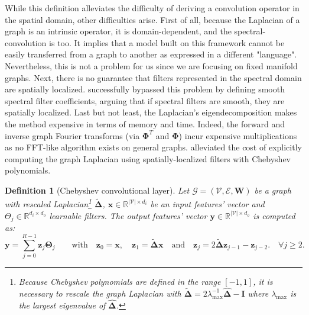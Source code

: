 \documentclass{article}
\newtheorem{definition}{Definition}[section]
\begin{document}
While this definition alleviates the difficulty of deriving a convolution operator in the spatial domain, other difficulties arise. First of all, because the Laplacian of a graph is an intrinsic operator, it is domain-dependent, and the spectral-convolution is too. It implies that a model built on this framework cannot be easily transferred from a graph to another as expressed in a different "language". Nevertheless, this is not a problem for us since we are focusing on fixed manifold graphs. Next, there is no guarantee that filters represented in the spectral domain are spatially localized. \citet{henaff2015deep} successfully bypassed this problem by defining smooth spectral filter coefficients, arguing that if spectral filters are smooth, they are spatially localized. Last but not least, the Laplacian's eigendecomposition makes the method expensive in terms of memory and time. Indeed, the forward and inverse graph Fourier transforms (via $\boldsymbol{\Phi}^T$ and $\boldsymbol{\Phi}$) incur expensive multiplications as no FFT-like algorithm exists on general graphs. \citet{defferrard2016chebnet} alleviated the cost of explicitly computing the graph Laplacian using spatially-localized filters with Chebyshev polynomials.

\begin{definition}[Chebyshev convolutional layer] \label{def:cheb_conv}
Let $\mathcal{G} = (\mathcal{V}, \mathcal{E}, \boldsymbol{W})$ be a graph with rescaled Laplacian\footnote{Because Chebyshev polynomials are defined in the range $[-1, 1]$, it is necessary to rescale the graph Laplacian with $\boldsymbol{\tilde{\Delta}} = 2\lambda_{\max}^{-1}\boldsymbol{\hat{\Delta}} - \boldsymbol{I}$ where $\lambda_{\max}$ is the largest eigenvalue of $\boldsymbol{\hat{\Delta}}$.} $\boldsymbol{\tilde{\Delta}}$, $\boldsymbol{x} \in \mathbb{R}^{|\mathcal{V}| \times d_i}$  be an input features' vector and $\Theta_j \in \mathbb{R}^{d_i \times d_o}$ learnable filters. The output features' vector $\boldsymbol{y} \in \mathbb{R}^{|\mathcal{V}| \times d_o}$ is computed as:
\begin{equation}
\boldsymbol{y} = \sum_{j=0}^{R-1} \boldsymbol{z}_j \boldsymbol{\Theta}_j \qquad \text{with} \quad \boldsymbol{z}_0 = \boldsymbol{x}, \quad \boldsymbol{z}_1 = \boldsymbol{\tilde{\Delta} x} \quad  \text{and} \quad \boldsymbol{z}_j = 2 \boldsymbol{\tilde{\Delta} z}_{j-1} - \boldsymbol{z}_{j-2}. \quad \forall j \geq 2.
\end{equation}
\end{definition}
\end{document}
